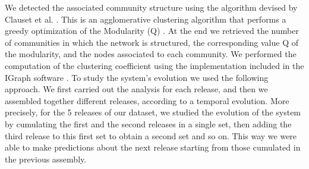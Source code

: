 We detected the associated community structure using the algorithm devised by 
Clauset et al. \cite{Clauset:2004}. 
This is an agglomerative clustering algorithm that performs a greedy optimization 
of the Modularity (Q) \cite{Newman:2003}. 
At the end we retrieved the number of communities in which the network is structured, 
the corresponding value Q of the modularity, and the nodes associated to each community. 
We performed the computation of the clustering coefficient using the implementation 
included in the IGraph software 
\cite{igraph}. 
To study the system's evolution we used the following approach. We first 
carried out the analysis for each release, and then we assembled together 
different releases, according to a temporal evolution. 
More precisely, for the 5 releases of our dataset, we
studied the evolution of the system by cumulating the first and 
the second releases in a single set, then adding the third release 
to this first set to obtain a second set and so on. 
This way we were able to make predictions about the next release 
starting from those cumulated in the previous assembly.

